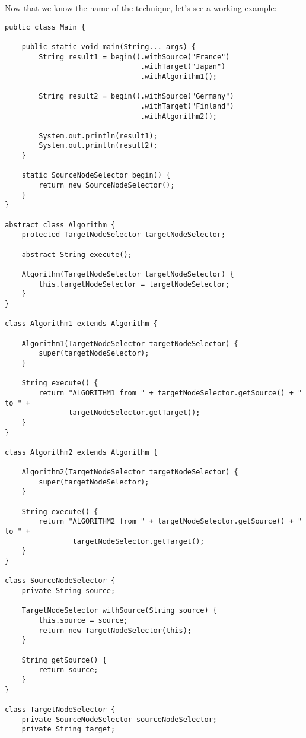 \documentclass[oneside]{book}
\begin{document}
Now that we know the name of the technique, let's see a working example:
\lstset{
  numbers=left
}
\begin{lstlisting}
public class Main {
    
    public static void main(String... args) {
        String result1 = begin().withSource("France")
                                .withTarget("Japan")
                                .withAlgorithm1();
        
        String result2 = begin().withSource("Germany")
                                .withTarget("Finland")
                                .withAlgorithm2();
        
        System.out.println(result1);
        System.out.println(result2);
    }
    
    static SourceNodeSelector begin() {
        return new SourceNodeSelector();
    }
}

abstract class Algorithm {
    protected TargetNodeSelector targetNodeSelector;
    
    abstract String execute();
    
    Algorithm(TargetNodeSelector targetNodeSelector) {
        this.targetNodeSelector = targetNodeSelector;
    }
}

class Algorithm1 extends Algorithm {
    
    Algorithm1(TargetNodeSelector targetNodeSelector) {
        super(targetNodeSelector);
    }
    
    String execute() {
        return "ALGORITHM1 from " + targetNodeSelector.getSource() + " to " +
               targetNodeSelector.getTarget();
    }
}

class Algorithm2 extends Algorithm {
    
    Algorithm2(TargetNodeSelector targetNodeSelector) {
        super(targetNodeSelector);
    }
    
    String execute() {
        return "ALGORITHM2 from " + targetNodeSelector.getSource() + " to " +
                targetNodeSelector.getTarget();
    }
}

class SourceNodeSelector {
    private String source;
    
    TargetNodeSelector withSource(String source) {
        this.source = source;
        return new TargetNodeSelector(this);
    }
    
    String getSource() {
        return source;
    }
}

class TargetNodeSelector {
    private SourceNodeSelector sourceNodeSelector;
    private String target;
    

\end{lstlisting}
\end{document}
